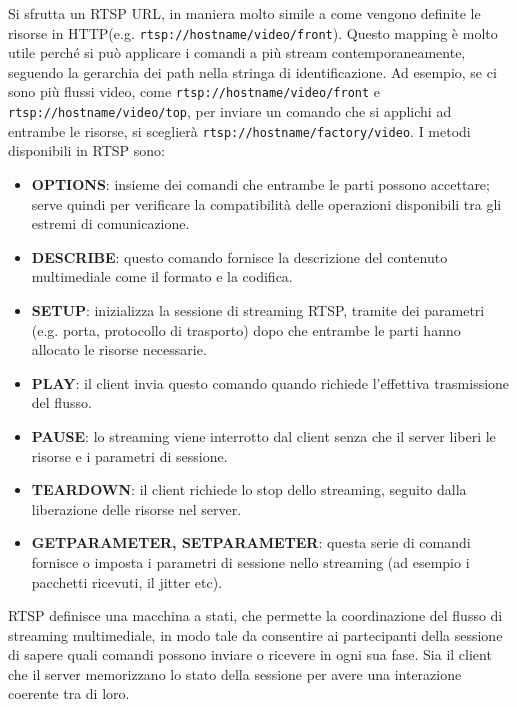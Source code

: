 Si sfrutta un RTSP URL, in maniera molto simile a come vengono definite le risorse in HTTP(e.g. \texttt{rtsp://hostname/video/front}). Questo mapping è molto utile perché si può applicare i comandi a più stream contemporaneamente, seguendo la gerarchia dei path nella stringa di identificazione. Ad esempio, se ci sono più flussi video, come \texttt{rtsp://hostname/video/front} e \texttt{rtsp://hostname/video/top}, per inviare un comando che si applichi ad entrambe le risorse, si sceglierà \sloppy\texttt{rtsp://hostname/factory/video}\fussy. %
I metodi disponibili in RTSP sono:
\begin{itemize}
	\item \textbf{OPTIONS}: insieme dei comandi che entrambe le parti possono accettare; serve quindi per verificare la compatibilità delle operazioni disponibili tra gli estremi di comunicazione.
	\item \textbf{DESCRIBE}: questo comando fornisce la descrizione del contenuto multimediale come il formato e la codifica. 
	\item \textbf{SETUP}: inizializza la sessione di streaming RTSP, tramite dei parametri (e.g. porta, protocollo di trasporto) dopo che entrambe le parti hanno allocato le risorse necessarie.
	\item \textbf{PLAY}: il client invia questo comando quando richiede l'effettiva trasmissione del flusso.
	\item \textbf{PAUSE}: lo streaming viene interrotto dal client senza che il server liberi le risorse e i parametri di sessione.
	\item \textbf{TEARDOWN}: il client richiede lo stop dello streaming, seguito dalla liberazione delle risorse nel server.
	\item \textbf{GET\textunderscore PARAMETER, SET\textunderscore PARAMETER}: questa serie di comandi fornisce o imposta i parametri di sessione nello streaming (ad esempio i pacchetti ricevuti, il jitter etc). 
\end{itemize}

RTSP definisce una macchina a stati, che permette la coordinazione del flusso di streaming multimediale, in modo tale da consentire ai partecipanti della sessione di sapere quali comandi possono inviare o ricevere in ogni sua fase. Sia il client che il server memorizzano lo stato della sessione per avere una interazione coerente tra di loro. 


